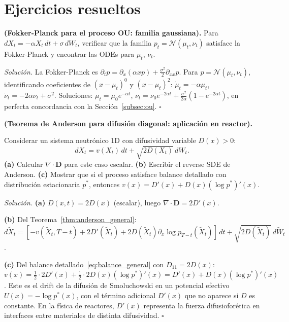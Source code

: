 \section*{Ejercicios resueltos}

\begin{ejercicio}
\label{ej:fp_ou}
\textbf{(Fokker-Planck para el proceso OU: familia gaussiana).}
Para $dX_t = -\alpha X_t\,dt + \sigma\,dW_t$, verificar que la familia
$p_t = \mathcal{N}(\mu_t,\nu_t)$ satisface la Fokker-Planck y encontrar
las ODEs para $\mu_t$, $\nu_t$.

\medskip\noindent\textit{Solución.}
La Fokker-Planck es $\partial_t p = \partial_x(\alpha x p) + \frac{\sigma^2}{2}
\partial_{xx}p$. Para $p = \mathcal{N}(\mu_t,\nu_t)$, identificando coeficientes
de $(x-\mu_t)^0$ y $(x-\mu_t)^2$:
$\dot{\mu}_t = -\alpha\mu_t$, $\dot{\nu}_t = -2\alpha\nu_t + \sigma^2$.
Soluciones: $\mu_t = \mu_0 e^{-\alpha t}$, $\nu_t = \nu_0 e^{-2\alpha t} +
\frac{\sigma^2}{2\alpha}(1-e^{-2\alpha t})$, en perfecta concordancia con la
Sección~\ref{subsec:ou}. $\square$
\end{ejercicio}

\begin{ejercicio}
\label{ej:anderson_diag}
\textbf{(Teorema de Anderson para difusión diagonal: aplicación en reactor).}

Considerar un sistema neutrónico 1D con difusividad variable $D(x) > 0$:
\[
  dX_t = v(X_t)\,dt + \sqrt{2D(X_t)}\,dW_t.
\]
\textbf{(a)} Calcular $\nabla\cdot\bm{D}$ para este caso escalar.
\textbf{(b)} Escribir el reverse SDE de Anderson.
\textbf{(c)} Mostrar que si el proceso satisface balance detallado con
distribución estacionaria $p^*$, entonces $v(x) = D'(x) + D(x)(\log p^*)'(x)$.

\medskip\noindent\textit{Solución.}
\textbf{(a)} $D(x,t) = 2D(x)$ (escalar), luego $\nabla\cdot\bm{D} = 2D'(x)$.

\textbf{(b)} Del Teorema~\ref{thm:anderson_general}:
$d\tilde{X}_t = [-v(\tilde{X}_t,T-t) + 2D'(\tilde{X}_t)
+ 2D(\tilde{X}_t)\partial_x\log p_{T-t}(\tilde{X}_t)]\,dt
+ \sqrt{2D(\tilde{X}_t)}\,d\tilde{W}_t$.

\textbf{(c)} Del balance detallado~\eqref{eq:balance_general} con $D_{11} = 2D(x)$:
$v(x) = \frac{1}{2}\cdot 2D'(x) + \frac{1}{2}\cdot 2D(x)(\log p^*)'(x)
= D'(x) + D(x)(\log p^*)'(x)$.
Este es el drift de la difusión de Smoluchowski en un potencial efectivo
$U(x) = -\log p^*(x)$, con el término adicional $D'(x)$ que no aparece si
$D$ es constante. En la física de reactores, $D'(x)$ representa la fuerza
difusioforética en interfaces entre materiales de distinta difusividad. $\square$
\end{ejercicio}

